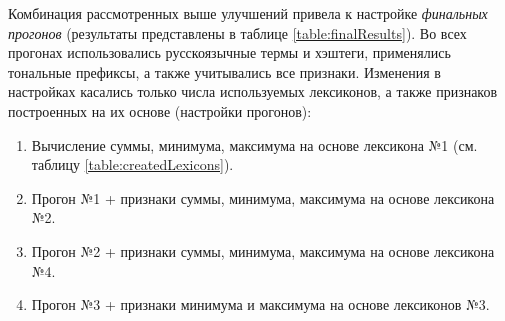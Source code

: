     Комбинация рассмотренных выше улучшений привела к настройке {\it финальных
прогонов} (результаты представлены в таблице \ref{table:finalResults}).
Во всех прогонах использовались русскоязычные термы и хэштеги, применялись
тональные префиксы, а также учитывались все признаки. Изменения в настройках
касались только числа используемых лексиконов, а также признаков построенных
на их основе (настройки прогонов):
    \begin{enumerate}
        \item Вычисление суммы, минимума, максимума на основе лексикона №1 (см. таблицу \ref{table:createdLexicons}).
        \item Прогон №1 + признаки суммы, минимума, максимума на основе лексикона №2.
        \item Прогон №2 + признаки суммы, минимума, максимума на основе лексикона №4.
        \item Прогон №3 + признаки минимума и максимума на основе лексиконов №3.
    \end{enumerate}

